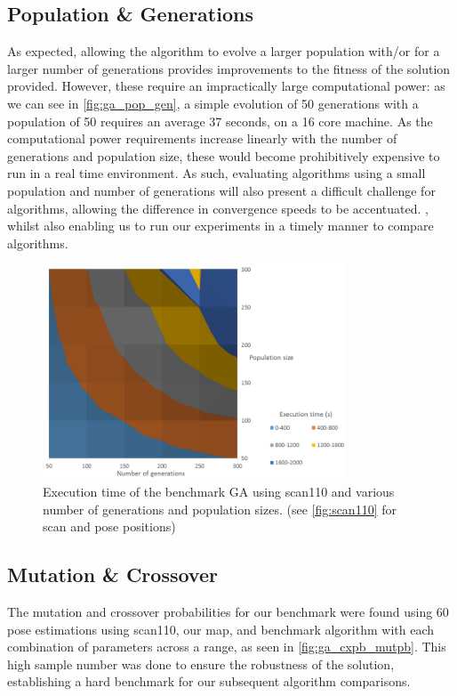\documentclass[authoryearcitations]{UoYCSproject}
\begin{document}
\subsection{Population \& Generations}
As expected, allowing the algorithm to evolve a larger population with/or for a larger number of generations provides improvements to the fitness of the solution provided. However, these require an impractically large computational power: as we can see in \autoref{fig:ga_pop_gen}, a simple evolution of 50 generations with a population of 50 requires an average 37 seconds, on a 16 core machine. As the computational power requirements increase linearly with the number of generations and population size, these would become prohibitively expensive to run in a real time environment. As such, evaluating algorithms using a small population and number of generations will also present a difficult challenge for algorithms, allowing the difference in convergence speeds to be accentuated. , whilst also enabling us to run our experiments in a timely manner to compare algorithms. 
\begin{figure}[]
\centering
	\includegraphics[width=9cm,keepaspectratio]{images/ga_pop_gen_sweep.png}
	\caption{Execution time of the benchmark GA using scan110 and various number of generations and population sizes. (see \autoref{fig:scan110} for scan and pose positions)}
	\label{fig:ga_pop_gen}
\end{figure}

\subsection{Mutation \& Crossover}
\label{subsec:benchmark_mutpb_cxpb}
The mutation and crossover probabilities for our benchmark were found using 60 pose estimations using scan110, our map, and benchmark algorithm with each combination of parameters across a range, as seen in \autoref{fig:ga_cxpb_mutpb}. This high sample number was done to ensure the robustness of the solution, establishing a hard benchmark for our subsequent algorithm comparisons.
\end{document}
